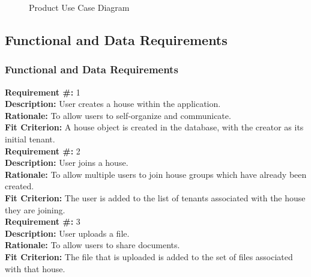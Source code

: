 \documentclass[12pt, titlepage]{article}
\begin{document}
\begin{figure}[H]
\caption{Product Use Case Diagram}
\end{figure}

\subsection{Functional and Data Requirements}
\subsubsection{Functional and Data Requirements}
\textbf{Requirement \#:} 1 
       \\
      \textbf{Description:} User creates a house within the application. \\
      \textbf{Rationale:} To allow users to self-organize and communicate. \\
      \textbf{Fit Criterion:} A house object is created in the database, with
      the creator as its initial tenant. \\
      
\textbf{Requirement \#:} 2 
       \\
      \textbf{Description:} User joins a house. \\
      \textbf{Rationale:} To allow multiple users to join house groups which
      have already been created. \\
      \textbf{Fit Criterion:} The user is added to the list of tenants
      associated with the house they are joining. \\

\textbf{Requirement \#:} 3 
       \\
      \textbf{Description:} User uploads a file. \\
      \textbf{Rationale:} To allow users to share documents. \\
      \textbf{Fit Criterion:} The file that is uploaded is added to the set of
      files associated with that house. \\
\end{document}

